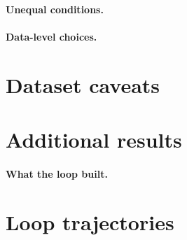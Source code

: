 \documentclass[11pt]{article}
\begin{document}
\paragraph{Unequal conditions.}

\paragraph{Data-level choices.}

\section{Dataset caveats}\label{app:caveats}

\section{Additional results}\label{app:results}

\paragraph{What the loop built.}

\section{Loop trajectories}\label{app:trajectories}

\FloatBarrier
\clearpage


\end{document}
